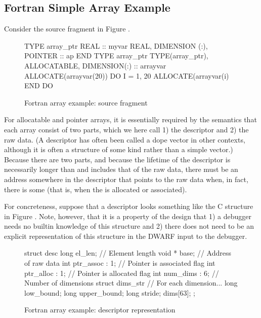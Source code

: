 \subsection{Fortran Simple Array Example}
\label{app:fortranarrayexample}
Consider the  source fragment in 
Figure .

\begin{figure}[ht]
\begin{nlnlisting}
        TYPE array_ptr
        REAL :: myvar
        REAL, DIMENSION (:), POINTER :: ap
        END TYPE array_ptr
        TYPE(array_ptr), ALLOCATABLE, DIMENSION(:) :: arrayvar
        ALLOCATE(arrayvar(20))
        DO I = 1, 20
            ALLOCATE(arrayvar(i)%
        END DO
\end{nlnlisting}
\caption{Fortran array example: source fragment} 
\label{fig:fortranarrayexamplesourcefragment}
\end{figure}

For allocatable and pointer arrays, it is essentially required
by the semantics that each array 
consist of two parts, which we here call 1) the 
descriptor
and 2) the raw
data. (A descriptor has often been called a dope vector in
other contexts, although it is often a structure of some kind
rather than a simple vector.) Because there are two parts,
and because the lifetime of the descriptor is necessarily
longer than and includes that of the raw data, there must be
an address somewhere in the descriptor that points to the
raw data when, in fact, there is some (that is, when 
the  is allocated or associated).

For concreteness, suppose that a descriptor looks something
like the C structure in 
Figure .
Note, however, that it is
a property of the design that 1) a debugger needs no builtin
knowledge of this structure and 2) there does not need to
be an explicit representation of this structure in the DWARF
input to the debugger.

\begin{figure}[ht]
\begin{nlnlisting}
struct desc {
    long el_len;       // Element length
    void * base;       // Address of raw data
    int ptr_assoc : 1; // Pointer is associated flag
    int ptr_alloc : 1; // Pointer is allocated flag
    int num_dims  : 6; // Number of dimensions
    struct dims_str {  // For each dimension...  
        long low_bound;
        long upper_bound;
        long stride;
    } dims[63];
};
\end{nlnlisting}
\caption{Fortran array example: descriptor representation}
\label{fig:fortranarrayexampledescriptorrepresentation}
\end{figure}


